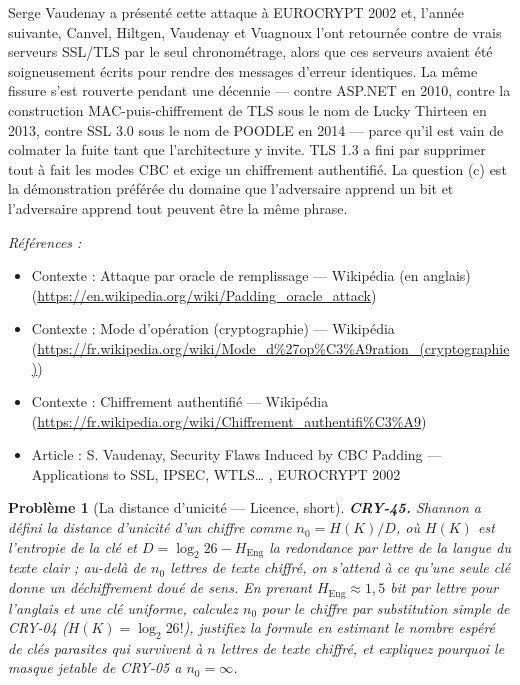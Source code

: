 \documentclass[11pt]{article}
\newtheorem{problem}{Problème}
\newenvironment{refs}{\par\small\noindent\emph{Références :}\begin{itemize}\setlength\itemsep{0pt}}{\end{itemize}\normalsize}
\begin{document}
\noindent Serge Vaudenay a présenté cette attaque à EUROCRYPT 2002 et, l'année
suivante, Canvel, Hiltgen, Vaudenay et Vuagnoux l'ont retournée contre de vrais serveurs
SSL/TLS par le seul chronométrage, alors que ces serveurs avaient été soigneusement écrits
pour rendre des messages d'erreur identiques. La même fissure s'est rouverte pendant une
décennie --- contre ASP.NET en 2010, contre la construction MAC-puis-chiffrement de TLS sous le
nom de \og{} Lucky Thirteen \fg{} en 2013, contre SSL 3.0 sous le nom de POODLE en 2014 --- parce qu'il
est vain de colmater la fuite tant que l'architecture y invite. TLS 1.3 a fini par supprimer
tout à fait les modes CBC et exige un chiffrement authentifié. La question (c) est la
démonstration préférée du domaine que \og{} l'adversaire apprend un bit \fg{} et \og{} l'adversaire
apprend tout \fg{} peuvent être la même phrase.

\begin{refs}
\item Contexte : Attaque par oracle de remplissage --- Wikipédia (en anglais) (\url{https://en.wikipedia.org/wiki/Padding_oracle_attack})
\item Contexte : Mode d'opération (cryptographie) --- Wikipédia (\url{https://fr.wikipedia.org/wiki/Mode_d%27op%C3%A9ration_(cryptographie)})
\item Contexte : Chiffrement authentifié --- Wikipédia (\url{https://fr.wikipedia.org/wiki/Chiffrement_authentifi%C3%A9})
\item Article : S. Vaudenay, \og{} Security Flaws Induced by CBC Padding --- Applications to SSL, IPSEC, WTLS\dots{} \fg{}, EUROCRYPT 2002
\end{refs}

\bigskip

\begin{problem}[{La distance d'unicité --- Licence, short}]
\textbf{CRY-45.} Shannon a défini la \textit{distance d'unicité} d'un chiffre
comme $n_0 = H(K)/D$, où $H(K)$ est l'entropie de la clé et
$D = \log_2 26 - H_{\mathrm{Eng}}$ la redondance par lettre de la langue du texte clair ;
au-delà de $n_0$ lettres de texte chiffré, on s'attend à ce qu'une seule clé donne un
déchiffrement doué de sens. En prenant $H_{\mathrm{Eng}} \approx 1{,}5$ bit par lettre pour
l'anglais et une clé uniforme, calculez $n_0$ pour le chiffre par substitution simple de
CRY-04 ($H(K) = \log_2 26!$), justifiez la formule en estimant le nombre espéré de clés
parasites qui survivent à $n$ lettres de texte chiffré, et expliquez pourquoi le masque
jetable de CRY-05 a $n_0 = \infty$.
\end{problem}
\end{document}
